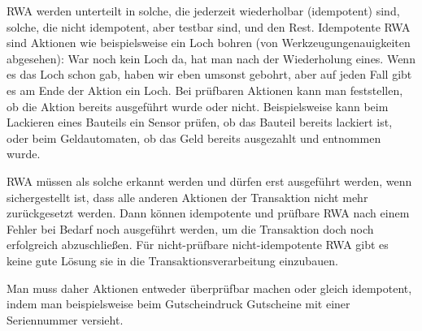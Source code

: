 \begin{enumerate}[a)]
\begin{solution}
	RWA werden unterteilt in solche, die jederzeit wiederholbar (idempotent) sind, solche, die nicht idempotent, aber testbar sind, und den Rest.
	Idempotente RWA sind Aktionen wie beispielsweise ein Loch bohren (von Werkzeugungenauigkeiten abgesehen): War noch kein Loch da, hat man nach der Wiederholung eines. Wenn es das Loch schon gab, haben wir eben umsonst gebohrt, aber auf jeden Fall gibt es am Ende der Aktion ein Loch.
	Bei prüfbaren Aktionen kann man feststellen, ob die Aktion bereits ausgeführt wurde oder nicht. Beispielsweise kann beim Lackieren eines Bauteils ein Sensor prüfen, ob das Bauteil bereits lackiert ist, oder beim Geldautomaten, ob das Geld bereits ausgezahlt und entnommen wurde.

	RWA müssen als solche erkannt werden und dürfen erst ausgeführt werden, wenn sichergestellt ist, dass alle anderen Aktionen der Transaktion nicht mehr zurückgesetzt werden. Dann können idempotente und prüfbare RWA nach einem Fehler bei Bedarf noch ausgeführt werden, um die Transaktion doch noch erfolgreich abzuschließen. Für nicht-prüfbare nicht-idempotente RWA gibt es keine gute Lösung sie in die Transaktionsverarbeitung einzubauen.

  Man muss daher Aktionen entweder überprüfbar machen oder gleich idempotent, indem man beispielsweise beim Gutscheindruck Gutscheine mit einer Seriennummer versieht.
	\end{solution}

\end{enumerate}
